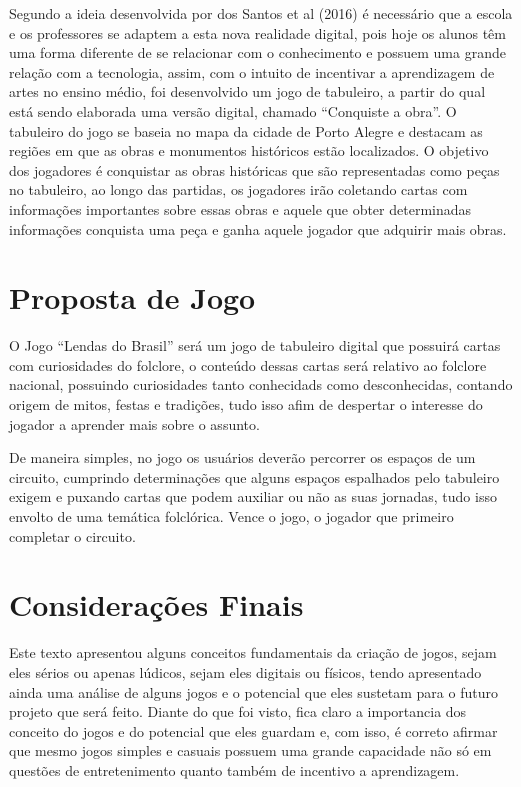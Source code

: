 \documentclass[12pt]{article}
\begin{document}
Segundo a ideia desenvolvida por dos Santos et al (2016) é necessário que a escola e os professores se adaptem a esta nova realidade digital, pois hoje os alunos têm uma forma diferente de se relacionar com o conhecimento e possuem uma grande relação com a tecnologia, assim, com o intuito de incentivar a aprendizagem de artes no ensino médio, foi desenvolvido um jogo de tabuleiro, a partir do qual está sendo elaborada uma versão digital, chamado “Conquiste a obra”. O tabuleiro do jogo se baseia no mapa da cidade de Porto Alegre e destacam as regiões em que as obras e monumentos históricos estão localizados. O objetivo dos jogadores é conquistar as obras históricas que são representadas como peças no tabuleiro, ao longo das partidas, os jogadores irão coletando cartas com informações importantes sobre essas obras e aquele que obter determinadas informações conquista uma peça e ganha aquele jogador que adquirir mais obras.

\section{Proposta de Jogo}

O Jogo “Lendas do Brasil” será um jogo de tabuleiro digital que possuirá cartas com curiosidades do folclore, o conteúdo dessas cartas será relativo ao folclore nacional, possuindo curiosidades tanto conhecidads como desconhecidas, contando origem de mitos, festas e tradições, tudo isso afim de despertar o interesse do jogador a aprender mais sobre o assunto.

De maneira simples, no jogo os usuários deverão percorrer os espaços de um circuito, cumprindo determinações que alguns espaços espalhados pelo tabuleiro exigem e puxando cartas que podem auxiliar ou não as suas jornadas, tudo isso envolto de uma temática folclórica. Vence o jogo, o jogador que primeiro completar o circuito.

\section{Considerações Finais}
Este texto apresentou alguns conceitos fundamentais da criação de jogos, sejam eles sérios ou apenas lúdicos, sejam eles digitais ou físicos, tendo apresentado ainda uma análise de alguns jogos e o potencial que eles sustetam para o futuro projeto que será feito. Diante do que foi visto, fica claro a importancia dos conceito do jogos e do potencial que eles guardam e, com isso, é correto afirmar que mesmo jogos simples e casuais possuem uma grande capacidade não só em questões de entretenimento quanto também de incentivo a aprendizagem.
\end{document}
